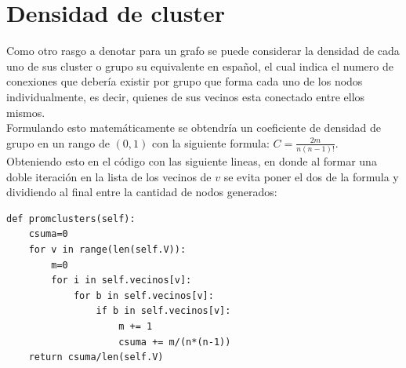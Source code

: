 \documentclass[12pt]{article}
\begin{document}
\section{Densidad de cluster}
Como otro rasgo a denotar para un grafo se puede considerar la densidad de cada uno de sus cluster o grupo su equivalente en español, el cual indica el numero de conexiones que debería existir por grupo que forma cada uno de los nodos individualmente, es decir, quienes de sus vecinos esta conectado entre ellos mismos.\\
Formulando esto matemáticamente se obtendría un coeficiente de densidad de grupo en un rango de $(0,1)$ con la siguiente formula: $C=\frac{2m}{n(n-1)!}$.\\ Obteniendo esto en el código con las siguiente lineas, en donde al formar una doble iteración en la lista de los vecinos de $v$ se evita poner el dos de la formula y dividiendo al final entre la cantidad de nodos generados:
\begin{lstlisting}[style=tt]
def promclusters(self):
	csuma=0
	for v in range(len(self.V)):
		m=0
		for i in self.vecinos[v]:
			for b in self.vecinos[v]:
				if b in self.vecinos[v]:
					m += 1
					csuma += m/(n*(n-1))
	return csuma/len(self.V)
\end{lstlisting}\pagebreak
\end{document}
